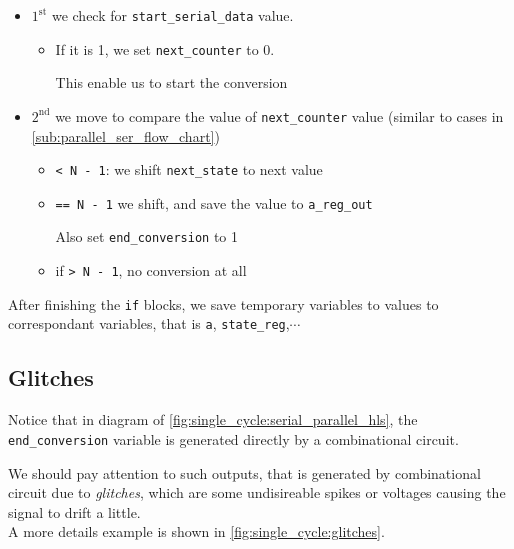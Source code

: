 \begin{itemize}

\item $\mathrm{1}^\mathrm{st}$ we check for \verb|start_serial_data| value. 

	\begin{itemize}
	\item If it is 1, we set \verb|next_counter| to 0.
	
	This enable us to start the conversion
	
	
	\end{itemize}


\item $\mathrm{2}^\mathrm{nd}$ we move to compare the value of \verb|next_counter| value (similar to cases in \ref{sub:parallel_ser_flow_chart})

	\begin{itemize}
	
	\item \verb|< N - 1|: we shift \verb|next_state| to next value
	
	\item \verb|== N - 1| we shift, and save the value to \verb|a_reg_out|
	
	Also set \verb|end_conversion| to 1
	
	\item if \verb|> N - 1|, no conversion at all

	\end{itemize}


\end{itemize}

After finishing the \verb|if| blocks, we save temporary variables to values to correspondant variables, that is \verb|a|, \verb|state_reg|,$\cdots$

\subsection{Glitches}
\label{sub:glitches}

Notice that in diagram of \autoref{fig:single_cycle:serial_parallel_hls}, the \verb|end_conversion| variable is generated directly by a combinational circuit.

We should pay attention to such outputs, that is generated by combinational circuit due to \textit{glitches}, which are some undisireable spikes or voltages causing the signal to drift a little.\\

A more details example is shown in \autoref{fig:single_cycle:glitches}.

